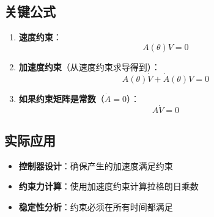 \documentclass[12pt,a4paper]{article}
\begin{document}
\subsection{关键公式}

\begin{enumerate}
\item \textbf{速度约束}：
\begin{equation}
A(\theta)V = 0
\end{equation}

\item \textbf{加速度约束}（从速度约束求导得到）：
\begin{equation}
A(\theta)\dot{V} + \dot{A}(\theta)V = 0
\end{equation}

\item \textbf{如果约束矩阵是常数}（$\dot{A} = 0$）：
\begin{equation}
A\dot{V} = 0
\end{equation}
\end{enumerate}

\subsection{实际应用}

\begin{itemize}
\item \textbf{控制器设计}：确保产生的加速度满足约束
\item \textbf{约束力计算}：使用加速度约束计算拉格朗日乘数
\item \textbf{稳定性分析}：约束必须在所有时间都满足
\end{itemize}
\end{document}
